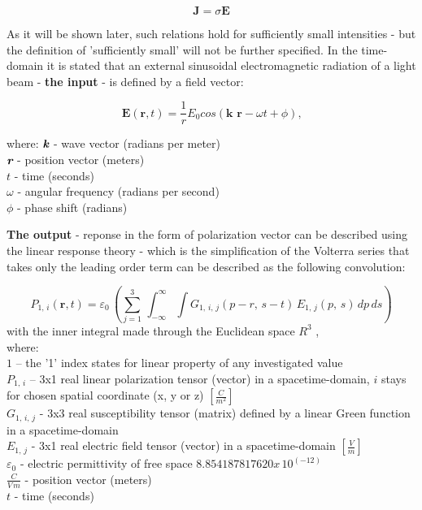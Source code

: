 \documentclass[12pt,twoside,a4paper]{article}
\numberwithin{equation}{subsection}
\numberwithin{figure}{subsection}
\begin{document}
\begin{equation} \label{eq:ohms_law}
  \textbf{J} = \sigma \textbf{E}
\end{equation}

As it will be shown later, such relations hold for sufficiently small intensities - but the definition of 'sufficiently small' will not be
further specified. In the time-domain it is stated that an external sinusoidal electromagnetic radiation of a light beam - \textbf{the
input} - is defined by a field vector:

\begin{equation} \label{eq:electromagnetic_radiation}
  \textbf{E} (\textbf{r}, t) =  \frac{1}{r} {E_{0}} cos(\textbf{k r} - \omega t + \phi) \mbox{,}
\end{equation}

where:
$\textit{\textbf{k}}$ - wave vector (radians per meter) \\
$\textit{\textbf{r}}$ - position vector (meters) \\
$t$ - time (seconds) \\
$\omega $ - angular frequency (radians per second) \\
$\phi $ - phase shift (radians)

\textbf{The output} - reponse in the form of polarization vector can be described using the linear response theory - which is the
simplification of the Volterra series that takes only the leading order term can be described as the following convolution:

\begin{equation} \label{eq:polarization_volterra}
  {P_{1, \,i}} (\textbf{r}, t) = {\varepsilon_{0}}\, \left(  \! \sum_{j=1}^{3}\,\int_{ -
  \infty }^{\infty }\int {G_{1, \,i, \,j}}(p - r, \,s - t)\,{E_{1,\,j}}(p, \,s)\,dp\,ds \!  \right)
\end{equation}
with the inner integral made through the Euclidean space $R^{3}$ \cite{thesis_novak},\\
where: \\
${1}$ -- the '1' index states for linear property of any investigated value \\
${P_{1, \,i}}$ -- 3x1 real linear polarization tensor (vector) in a spacetime-domain, $i$ stays for chosen spatial coordinate (x, y or z)
$[\frac {C}{m^{2}}]$ \\
${G_{1, \,i, \,j}}$ - 3x3 real susceptibility tensor (matrix) defined by a linear Green function in a spacetime-domain \cite{fakiszscan} \\
${E_{1, \,j}}$ - 3x1 real electric field tensor (vector) in a spacetime-domain $[\frac {V}{m}]$ \\
${\varepsilon_{0}}$ - electric permittivity of free space $8.854187817620 x\,10^{( - 12)}$ \\
$\frac {C}{V\,m}$  -  position vector (meters)  \\
$t$ - time (seconds)
\end{document}
